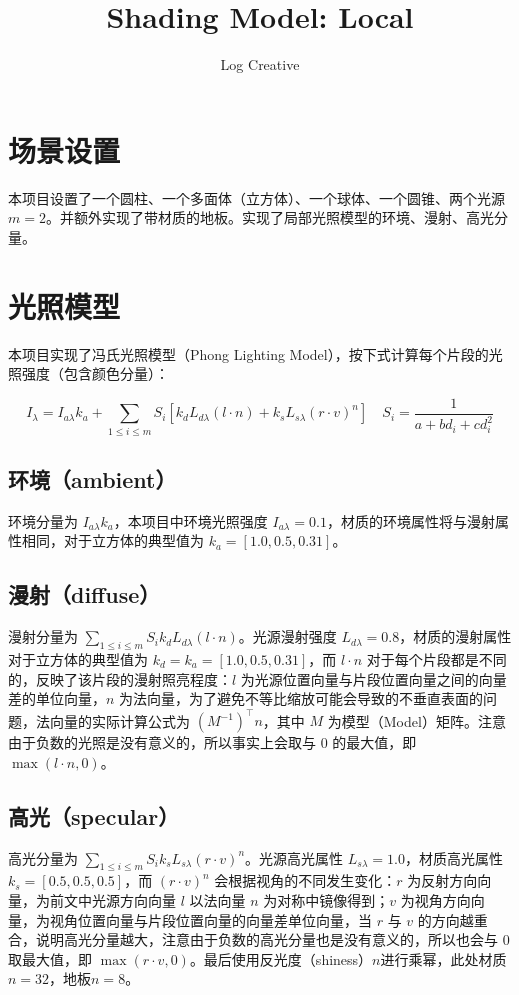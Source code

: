 \documentclass[math-font=newcm]{sjtuarticle}
\title{Shading Model: Local}
\author{Log Creative}
\begin{document}
\maketitle

\tableofcontents*
\clearpage

\section{场景设置}

本项目设置了一个圆柱、一个多面体（立方体）、一个球体、一个圆锥、两个光源$m=2$。并额外实现了带材质的地板。实现了局部光照模型的环境、漫射、高光分量。

\section{光照模型}

本项目实现了冯氏光照模型（Phong Lighting Model），按下式计算每个片段的光照强度（包含颜色分量）：

\begin{equation}\label{eq:phong}
    I_\lambda=I_{a\lambda}k_a+\sum_{1\leq i\leq m}S_i[k_dL_{d\lambda}(l\cdot n)+k_sL_{s\lambda}(r\cdot v)^n]\quad S_i=\frac{1}{a+bd_i+cd_i^2}
\end{equation}

\subsection{环境（ambient）}

环境分量为 $I_{a\lambda}k_a$，本项目中环境光照强度 $I_{a\lambda}=0.1$，材质的环境属性将与漫射属性相同，对于立方体的典型值为 $k_a=[1.0, 0.5, 0.31]$。

\subsection{漫射（diffuse）}
漫射分量为 $\sum_{1\leq i\leq m}S_ik_dL_{d\lambda}(l\cdot n)$。光源漫射强度 $L_{d\lambda}=0.8$，材质的漫射属性对于立方体的典型值为 $k_d=k_a=[1.0, 0.5, 0.31]$，而 $l\cdot n$ 对于每个片段都是不同的，反映了该片段的漫射照亮程度：$l$ 为光源位置向量与片段位置向量之间的向量差的单位向量，$n$ 为法向量，为了避免不等比缩放可能会导致的不垂直表面的问题\cite{normal}，法向量的实际计算公式为 $(M^{-1})^\top n$，其中 $M$ 为模型（Model）矩阵。注意由于负数的光照是没有意义的，所以事实上会取与 0 的最大值，即 $\max(l\cdot n, 0)$。

\subsection{高光（specular）}
高光分量为 $\sum_{1\leq i\leq m}S_ik_sL_{s\lambda}(r\cdot v)^n$。光源高光属性 $L_{s\lambda}=1.0$，材质高光属性 $k_s=[0.5,0.5,0.5]$，而 $(r\cdot v)^n$ 会根据视角的不同发生变化：$r$ 为反射方向向量，为前文中光源方向向量 $l$ 以法向量 $n$ 为对称中镜像得到；$v$ 为视角方向向量，为视角位置向量与片段位置向量的向量差单位向量，当 $r$ 与 $v$ 的方向越重合，说明高光分量越大，注意由于负数的高光分量也是没有意义的，所以也会与 0 取最大值，即 $\max(r\cdot v,0)$。最后使用反光度（shiness）$n$进行乘幂，此处材质 $n=32$，地板$n=8$。
\end{document}
